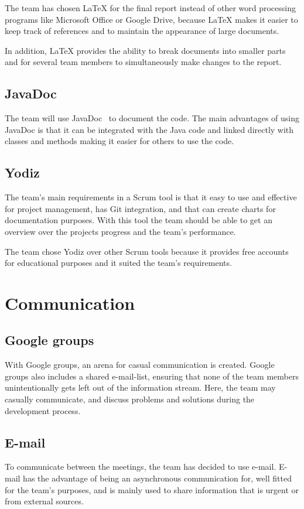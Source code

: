 The team has chosen LaTeX for the final report instead of other word processing programs like Microsoft Office or Google Drive, because LaTeX makes it easier to keep track of references and to maintain the appearance of large
documents. 

In addition, LaTeX provides the ability to break documents into smaller parts and for several team members to simultaneously make changes to the report.


\subsection{JavaDoc}
The team will use JavaDoc~\cite{javadoc} to document the code. The main advantages of using JavaDoc is that it can be integrated with the Java code and linked directly with classes and methods making it easier for others to use the code.

\subsection{Yodiz}
The team's main requirements in a Scrum tool is that it easy to use and effective for project management, has Git integration, and that can create charts for documentation purposes. With this tool the team should be able to get an overview over the projects progress and the team's performance. 

The team chose Yodiz over other Scrum tools because it provides 
free accounts for educational purposes and it suited the team's requirements. 

\section{Communication}
\subsection{Google groups}
With Google groups, an arena for casual communication is created. Google groups also includes a shared e-mail-list, ensuring that none of the team members unintentionally gets left out of the information stream. Here, the team may casually communicate, and discuss problems and solutions during the development process.


\subsection{E-mail}
To communicate between the meetings, the team has decided to use e-mail. E-mail has the advantage of being an asynchronous communication for, well fitted for the team's purposes, and is mainly used to share information that is urgent or from external sources.

